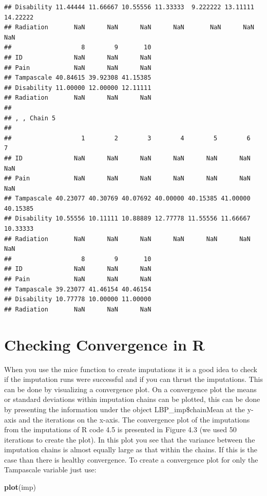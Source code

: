 \documentclass[]{book}
\newenvironment{Shaded}{\begin{snugshade}}{\end{snugshade}}
\newcommand{\KeywordTok}[1]{\textcolor[rgb]{0.13,0.29,0.53}{\textbf{#1}}}
\newcommand{\NormalTok}[1]{#1}
\theoremstyle{definition}
\theoremstyle{definition}
\theoremstyle{definition}
\theoremstyle{remark}
\begin{document}
\begin{verbatim}
## Disability 11.44444 11.66667 10.55556 11.33333  9.222222 13.11111 14.22222
## Radiation       NaN      NaN      NaN      NaN       NaN      NaN      NaN
##                   8        9       10
## ID              NaN      NaN      NaN
## Pain            NaN      NaN      NaN
## Tampascale 40.84615 39.92308 41.15385
## Disability 11.00000 12.00000 12.11111
## Radiation       NaN      NaN      NaN
## 
## , , Chain 5
## 
##                   1        2        3        4        5        6        7
## ID              NaN      NaN      NaN      NaN      NaN      NaN      NaN
## Pain            NaN      NaN      NaN      NaN      NaN      NaN      NaN
## Tampascale 40.23077 40.30769 40.07692 40.00000 40.15385 41.00000 40.15385
## Disability 10.55556 10.11111 10.88889 12.77778 11.55556 11.66667 10.33333
## Radiation       NaN      NaN      NaN      NaN      NaN      NaN      NaN
##                   8        9       10
## ID              NaN      NaN      NaN
## Pain            NaN      NaN      NaN
## Tampascale 39.23077 41.46154 40.46154
## Disability 10.77778 10.00000 11.00000
## Radiation       NaN      NaN      NaN
\end{verbatim}

\section{Checking Convergence in R}\label{checking-convergence-in-r}

When you use the mice function to create imputations it is a good idea
to check if the imputation runs were successful and if you can thrust
the imputations. This can be done by visualizing a convergence plot. On
a convergence plot the means or standard deviations within imputation
chains can be plotted, this can be done by presenting the information
under the object LBP\_imp\$chainMean at the y-axis and the iterations on
the x-axis. The convergence plot of the imputations from the imputations
of R code 4.5 is presented in Figure 4.3 (we used 50 iterations to
create the plot). In this plot you see that the variance between the
imputation chains is almost equally large as that within the chains. If
this is the case than there is healthy convergence. To create a
convergence plot for only the Tampascale variable just use:

\begin{Shaded}
\begin{Highlighting}[]
\KeywordTok{plot}\NormalTok{(imp)}
\end{Highlighting}
\end{Shaded}
\end{document}
